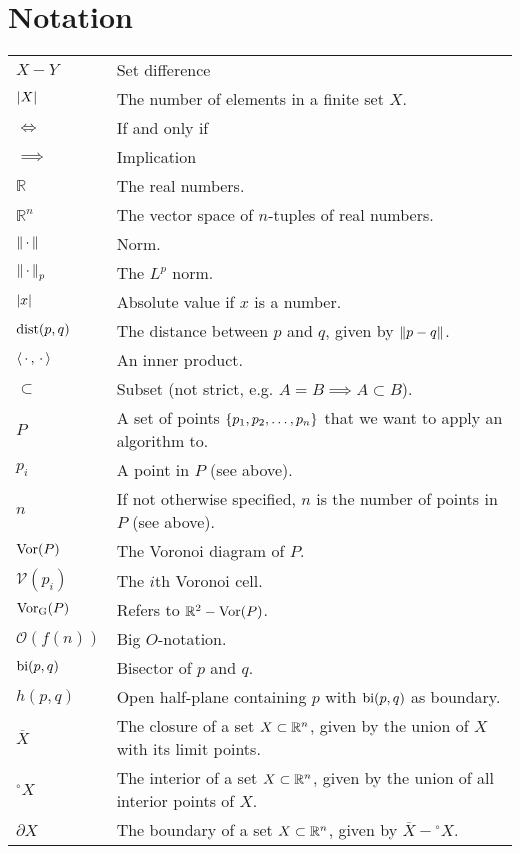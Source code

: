 \chapter{Notation}

\begin{table}[H]
\begin{tabular}{ll}
$X - Y$ & Set difference \\
$\left\lvert X \right\rvert$ & The number of elements in a finite set $X$. \\
$\iff$ & If and only if \\
$\implies$ & Implication \\
$\mathbb{R}$ & The real numbers. \\
$\mathbb{R}^n$ & The vector space of $n$-tuples of real numbers. \\
$\left\lVert \,\cdot\, \right\rVert$ & Norm. \\
$\left\lVert \,\cdot\, \right\rVert_p$ & The $L^p$ norm. \\
$\left\lvert x \right\rvert$    & Absolute value if $x$ is a number. \\
$\operatorname{dist}(p, q)$ & The distance between $p$ and $q$, given by $\left\lVert p - q \right\rVert$. \\
$\left\langle \,\cdot\,, \,\cdot\, \right\rangle$ & An inner product. \\
$\subset$    & Subset (not strict, e.g. $A = B \implies A \subset B$). \\
$P$ & A set of points $\{p_1, p_2, \ldots, p_n\}$ that we want to apply an algorithm to. \\
$p_i$ & A point in $P$ (see above). \\
$n$ & If not otherwise specified, $n$ is the number of points in $P$ (see above). \\
$\operatorname{Vor}(P)$    & The Voronoi diagram of $P$. \\
$\mathcal{V}(p_i)$    & The $i$th Voronoi cell. \\
$\operatorname{Vor_{G}}(P)$    & Refers to $\mathbb{R}^2 - \operatorname{Vor}(P)$. \\
$\mathcal{O}(f(n))$ & Big $O$-notation. \\
$\operatorname{bi}(p,q)$    & Bisector of $p$ and $q$. \\
$h(p,q)$    & Open half-plane containing $p$ with $\operatorname{bi}(p,q)$ as boundary. \\
$\overline{X}$ & The closure of a set $X \subset \mathbb{R}^n$, given by the union of $X$ with its limit points. \\
${}^{\circ}X$ & The interior of a set $X \subset \mathbb{R}^n$, given by the union of all interior points of $X$. \\
$\partial X$  & The boundary of a set $X \subset \mathbb{R}^n$, given by $\overline{X} - {}^{\circ}X$. \\

\end{tabular}
\end{table}
